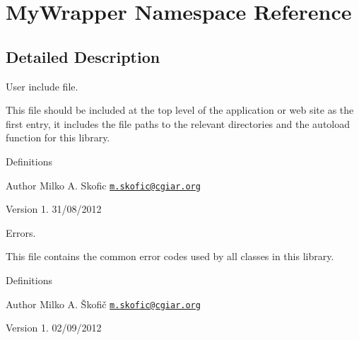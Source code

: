 \hypertarget{namespace_my_wrapper}{\section{My\-Wrapper Namespace Reference}
\label{namespace_my_wrapper}
}


\subsection{Detailed Description}
User include file.

This file should be included at the top level of the application or web site as the first entry, it includes the file paths to the relevant directories and the autoload function for this library.

Definitions

\begin{DoxyAuthor}{Author}
Milko A. Skofic \href{mailto:m.skofic@cgiar.org}{\tt m.\-skofic@cgiar.\-org} 
\end{DoxyAuthor}
\begin{DoxyVersion}{Version}
1. 31/08/2012
\end{DoxyVersion}
Errors.

This file contains the common error codes used by all classes in this library.

Definitions

\begin{DoxyAuthor}{Author}
Milko A. Škofič \href{mailto:m.skofic@cgiar.org}{\tt m.\-skofic@cgiar.\-org} 
\end{DoxyAuthor}
\begin{DoxyVersion}{Version}
1. 02/09/2012 
\end{DoxyVersion}

